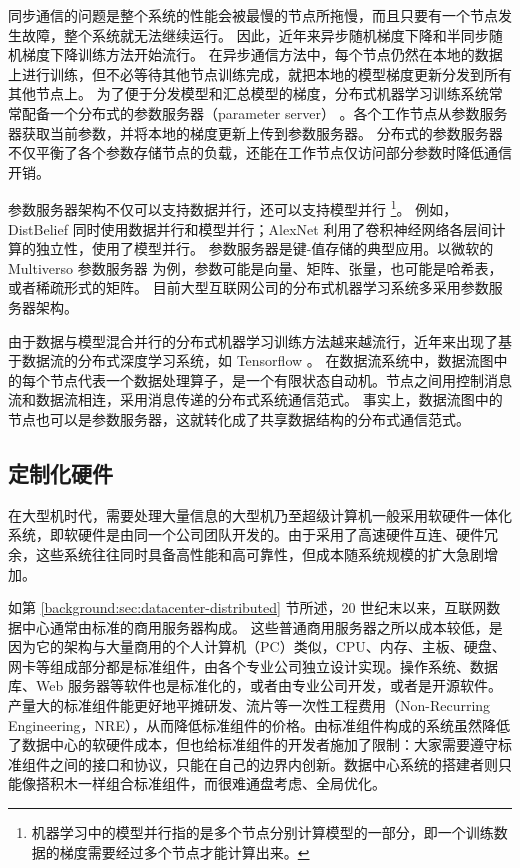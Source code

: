 同步通信的问题是整个系统的性能会被最慢的节点所拖慢，而且只要有一个节点发生故障，整个系统就无法继续运行。
因此，近年来异步随机梯度下降和半同步随机梯度下降训练方法开始流行。
在异步通信方法中，每个节点仍然在本地的数据上进行训练，但不必等待其他节点训练完成，就把本地的模型梯度更新分发到所有其他节点上。
为了便于分发模型和汇总模型的梯度，分布式机器学习训练系统常常配备一个分布式的参数服务器（parameter server） \cite{li2014scaling}。各个工作节点从参数服务器获取当前参数，并将本地的梯度更新上传到参数服务器。
分布式的参数服务器不仅平衡了各个参数存储节点的负载，还能在工作节点仅访问部分参数时降低通信开销。

参数服务器架构不仅可以支持数据并行，还可以支持模型并行 \footnote{机器学习中的模型并行指的是多个节点分别计算模型的一部分，即一个训练数据的梯度需要经过多个节点才能计算出来。}。
例如，DistBelief \cite{dean2012large} 同时使用数据并行和模型并行；AlexNet \cite{krizhevsky2012imagenet} 利用了卷积神经网络各层间计算的独立性，使用了模型并行。
参数服务器是键-值存储的典型应用。以微软的 Multiverso 参数服务器 \cite{multiverso} 为例，参数可能是向量、矩阵、张量，也可能是哈希表，或者稀疏形式的矩阵。
目前大型互联网公司的分布式机器学习系统多采用参数服务器架构。

由于数据与模型混合并行的分布式机器学习训练方法越来越流行，近年来出现了基于数据流的分布式深度学习系统，如 Tensorflow \cite{abadi2016tensorflow}。
在数据流系统中，数据流图中的每个节点代表一个数据处理算子，是一个有限状态自动机。节点之间用控制消息流和数据流相连，采用消息传递的分布式系统通信范式。
事实上，数据流图中的节点也可以是参数服务器，这就转化成了共享数据结构的分布式通信范式。






\subsection{定制化硬件}
\label{background:sec:datacenter-customized}


在大型机时代，需要处理大量信息的大型机乃至超级计算机一般采用软硬件一体化系统，即软硬件是由同一个公司团队开发的。由于采用了高速硬件互连、硬件冗余，这些系统往往同时具备高性能和高可靠性，但成本随系统规模的扩大急剧增加。

如第 \ref{background:sec:datacenter-distributed} 节所述，20 世纪末以来，互联网数据中心通常由标准的商用服务器构成。
这些普通商用服务器之所以成本较低，是因为它的架构与大量商用的个人计算机（PC）类似，CPU、内存、主板、硬盘、网卡等组成部分都是标准组件，由各个专业公司独立设计实现。操作系统、数据库、Web 服务器等软件也是标准化的，或者由专业公司开发，或者是开源软件。产量大的标准组件能更好地平摊研发、流片等一次性工程费用（Non-Recurring Engineering，NRE），从而降低标准组件的价格。由标准组件构成的系统虽然降低了数据中心的软硬件成本，但也给标准组件的开发者施加了限制：大家需要遵守标准组件之间的接口和协议，只能在自己的边界内创新。数据中心系统的搭建者则只能像搭积木一样组合标准组件，而很难通盘考虑、全局优化。

